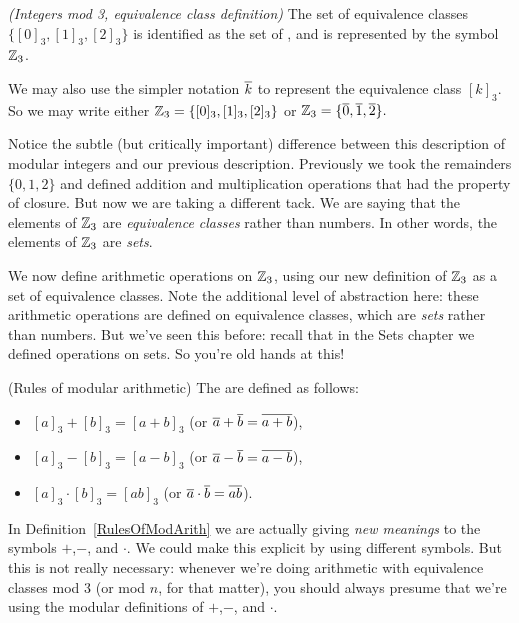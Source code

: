 \begin{defn}\label{mod_eqiv_def_3} \emph{(Integers mod 3, equivalence class definition)}
The set of equivalence classes $\{ [0]_3, [1]_3, [2]_3 \}$ is identified as the set of , and is represented by the symbol~$\mathbb{Z}_3$.

We may also use the simpler notation $\overline{k}$ to represent the equivalence class  $[k]_3$. So we may write either  
$\mathbb{Z}_3 = \{ [0]_3, [1]_3, [2]_3 \}$ or $\mathbb{Z}_3 = \{ \overline{0}, \overline{1}, \overline{2} \} .$
\end{defn}

Notice the subtle (but critically important) difference between this description of modular integers and our previous description. Previously we took the remainders $\{0,1,2\}$ and defined addition and multiplication operations that had the property of closure. But now we are taking a different tack. We are saying that the elements of $\mathbb{Z}_3$ are \emph{equivalence classes} rather than numbers. In other words, the elements of $\mathbb{Z}_3$ are \emph{sets}.

We now define arithmetic operations on $\mathbb{Z}_3$, using our new definition of $\mathbb{Z}_3$ as a set of equivalence classes. Note the additional level of abstraction here: these arithmetic operations are defined on equivalence classes, which are \emph{sets} rather than numbers. But we've seen this before: recall that in the Sets chapter we defined operations on sets. So you're old hands at this!

\begin{defn}\label{RulesOfModArith} (Rules of modular arithmetic)
The  are defined as follows:
\begin{itemize}
\item $[a]_3 + [b]_3 = [a+b]_3$ \qquad (or $\overline{a} + \overline{b} = \overline{a + b}$),
\item $[a]_3 - [b]_3 = [a-b]_3$ \qquad (or $\overline{a} - \overline{b} = \overline{a - b}$),
\item $[a]_3 \cdot [b]_3 = [ab]_3$\hphantom{${}\cdot{}$}
\qquad (or $\overline{a} \cdot \overline{b} = \overline{a  b}$).
\end{itemize}
\end{defn}

In Definition~\ref{RulesOfModArith} we are actually giving \emph{new meanings} to the symbols $+$,$-$, and $\cdot$. We could make this explicit by using different symbols. But this is not really necessary: whenever we're doing arithmetic with equivalence classes mod 3 (or mod $n$, for that matter), you should always presume that we're using the modular definitions of $+$,$-$, and $\cdot$.

